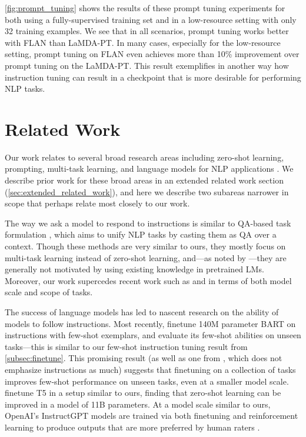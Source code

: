\ref{fig:prompt_tuning} shows the results of these prompt tuning experiments for both using a fully-supervised training set and in a low-resource setting with only 32 training examples. We see that in all scenarios, prompt tuning works better with FLAN than LaMDA-PT. In many cases, especially for the low-resource setting, prompt tuning on FLAN even achieves more than 10\% improvement over prompt tuning on the LaMDA-PT. This result exemplifies in another way how instruction tuning can result in a checkpoint that is more desirable for performing NLP tasks.

\section{Related Work} Our work relates to several broad research areas including zero-shot learning, prompting, multi-task learning, and language models for NLP applications \citep[][\textit{inter alia}]{radford2019language,raffel2019exploring,brown2020language,efrat2020turking,aghajanyan2021muppet,li-liang-2021-prefix}. We describe prior work for these broad areas in an extended related work section (\ref{sec:extended_related_work}), and here we describe two subareas narrower in scope that perhaps relate most closely to our work.

The way we ask a model to respond to instructions is similar to QA-based task formulation \citep{kumar2016ask,mccann2018natural}, which aims to unify NLP tasks by casting them as QA over a context. Though these methods are very similar to ours, they mostly focus on multi-task learning instead of zero-shot learning, and---as noted by \citet{liu2021survey}---they are generally not motivated by using existing knowledge in pretrained LMs. Moreover, our work supercedes recent work such as \citet{chai2020description} and \citet{zhong2021meta} in terms of both model scale and scope of tasks.

The success of language models has led to nascent research on the ability of models to follow instructions. Most recently, \citet{mishra2021natural} finetune 140M parameter BART on instructions with few-shot exemplars, and evaluate its few-shot abilities on unseen tasks---this is similar to our few-shot instruction tuning result from \ref{subsec:finetune}.
This promising result (as well as one from \citet{ye2021crossfit}, which does not emphasize instructions as much) suggests that finetuning on a collection of tasks improves few-shot performance on unseen tasks, even at a smaller model scale.
\citet{sanh2021multitask} finetune T5 in a setup similar to ours, finding that zero-shot learning can be improved in a model of 11B parameters. At a model scale similar to ours, OpenAI's InstructGPT models are trained via both finetuning and reinforcement learning to produce outputs that are more preferred by human raters \citep{ouyang2022instructgpt}.

